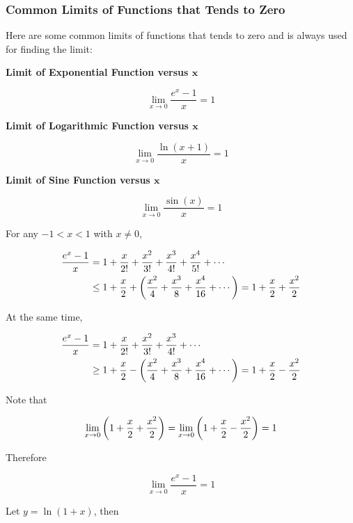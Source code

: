 \documentclass[a4paper,12pt]{article}
\begin{document}
\subsubsection{Common Limits of Functions that Tends to Zero}
\begin{pst}
  Here are some common limits of functions that tends to zero and is always used for finding the limit:

  \begin{alist}
    \item \textbf{Limit of Exponential Function versus $\boldsymbol{x}$}

    $$\lim_{x\to 0}\frac{e^{x}-1}{x}=1$$

    \item \textbf{Limit of Logarithmic Function versus $\boldsymbol{x}$}

    $$\lim_{x\to 0}\frac{\ln(x+1)}{x}=1$$

    \item \textbf{Limit of Sine Function versus $\boldsymbol{x}$}

    $$\lim_{x\to 0}\frac{\sin(x)}{x}=1$$
  \end{alist}

  \prf{} For any $-1<x<1$ with $x\neq 0$,

  $$\begin{aligned}[t]
    \frac{e^{x}-1}{x}&=1+\frac{x}{2!}+\frac{x^{2}}{3!}+\frac{x^{3}}{4!}+\frac{x^{4}}{5!}+\cdots\\
    &\leq 1+\frac{x}{2}+\left( \frac{x^{2}}{4}+\frac{x^{3}}{8}+\frac{x^{4}}{16}+\cdots\right)=1+\frac{x}{2}+\frac{x^{2}}{2}
  \end{aligned}$$\s

  At the same time,

  $$\begin{aligned}[t]
    \frac{e^{x}-1}{x}&=1+\frac{x}{2!}+\frac{x^{2}}{3!}+\frac{x^{3}}{4!}+\cdots\\
    &\geq 1+\frac{x}{2}-\left( \frac{x^{2}}{4}+\frac{x^{3}}{8}+\frac{x^{4}}{16}+\cdots\right)=1+\frac{x}{2}-\frac{x^{2}}{2}
  \end{aligned}$$\s

  Note that

  $$\lim_{x\to 0}\left( 1+\frac{x}{2}+\frac{x^{2}}{2}\right)=\lim_{x\to 0}\left( 1+\frac{x}{2}-\frac{x^{2}}{2}\right)=1$$\s

  Therefore

  $$\lim_{x\to 0}\frac{e^{x}-1}{x}=1$$\s

   Let $y=\ln(1+x)$, then


\end{pst}
\end{document}
